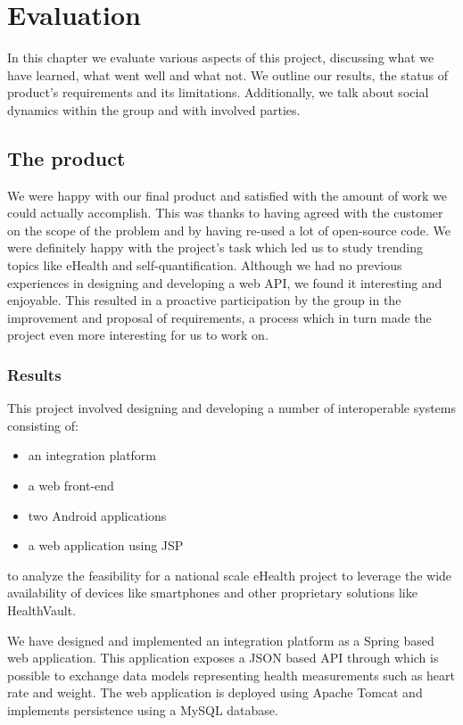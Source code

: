 
\chapter{Evaluation} 
\label{ch:evaluation}


In this chapter we evaluate various aspects of this project, discussing what we
have learned, what went well and what not.
We outline our results, the status of product's requirements and its limitations.
Additionally, we talk about social dynamics within the group and with involved parties.

\section{The product}

We were happy with our final product and satisfied with the amount of work we could actually accomplish.
This was thanks to having agreed with the customer on the scope of the problem and by having re-used a
lot of open-source code. We were definitely happy with the project's task which led us to study trending topics
like eHealth and self-quantification. Although we had no previous experiences in designing and developing a web API,
we found it interesting and enjoyable. This resulted in a proactive participation by the group
in the improvement and proposal of requirements, a process which in turn made the project even more interesting
for us to work on.

\subsection{Results}

This project involved designing and developing a number of interoperable systems consisting of:
\begin{itemize}
\item an integration platform
\item a web front-end
\item two Android applications
\item a web application using JSP
\end{itemize}
to analyze the feasibility for a national scale eHealth project to leverage the wide availability of devices
like smartphones and other proprietary solutions like HealthVault.

We have designed and implemented an integration platform as a Spring based web application.
This application exposes a JSON based API through which is possible to exchange data models
representing health measurements such as heart rate and weight.
The web application is deployed using Apache Tomcat and implements persistence using a MySQL database.

